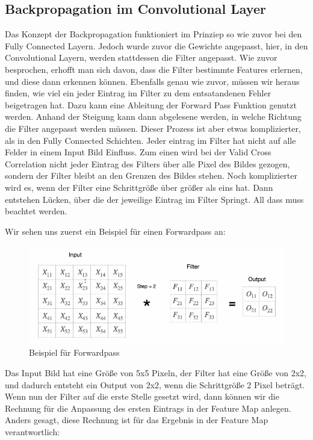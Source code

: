 \documentclass[12pt]{article}
\begin{document}
\subsection{Backpropagation im Convolutional Layer}
Das Konzept der Backpropagation funktioniert im Prinziep so wie zuvor bei den Fully Connected Layern. Jedoch wurde zuvor die Gewichte angepasst, hier, in den Convolutional Layern, werden stattdessen die Filter angepasst. Wie zuvor besprochen, erhofft man sich davon, dass die Filter bestimmte Features erlernen, und diese dann erkennen können.
Ebenfalls genau wie zuvor, müssen wir heraus finden, wie viel ein jeder Eintrag im Filter zu dem entsatandenen Fehler beigetragen hat. Dazu kann eine Ableitung der Forward Pass Funktion genutzt werden. Anhand der Steigung kann dann abgelesene werden, in welche Richtung die Filter angepasst werden müssen. Dieser Prozess ist aber etwas komplizierter, als in den Fully Connected Schichten. Jeder eintrag im Filter hat nicht auf alle Felder in einem Input Bild Einfluss. Zum einen wird bei der Valid Cross Correlation nicht jeder Eintrag des Filters über alle Pixel des Bildes gezogen, sondern der Filter bleibt an den Grenzen des Bildes stehen. Noch komplizierter wird es, wenn der Filter eine Schrittgröße über größer als eins hat. Dann entstehen Lücken, über die der jeweilige Eintrag im Filter Springt. All dass muss beachtet werden. 

Wir sehen uns zuerst ein Beispiel für einen Forwardpass an:

\begin{figure}[H]
\centering
\includegraphics[scale=0.50]{./Images/TemporaryPlaceholders/Bildschirmfoto vom 2024-05-20 15-33-37.png}
\caption{Beispiel für Forwardpass}
\label{Beispiel für Forwardpass}
\end{figure}

Das Input Bild hat eine Größe von 5x5 Pixeln, der Filter hat eine Größe von 2x2, und dadurch entsteht ein Output von 2x2, wenn die Schrittgröße 2 Pixel beträgt. 
Wenn nun der Filter auf die erste Stelle gesetzt wird, dann können wir die Rechnung für die Anpassung des ersten Eintrags in der Feature Map anlegen. Anders gesagt, diese Rechnung ist für das Ergebnis in der Feature Map verantwortlich:
\end{document}
